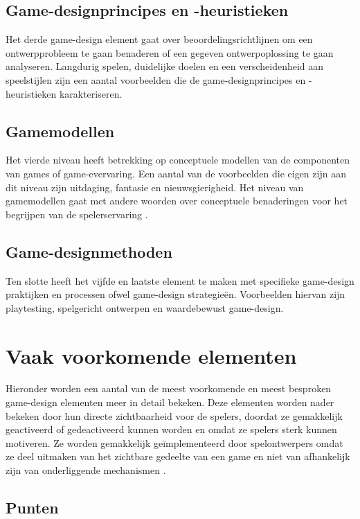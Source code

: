 \subsection{Game-designprincipes en -heuristieken}

Het derde game-design element gaat over beoordelingsrichtlijnen om een ontwerpprobleem te gaan benaderen of een gegeven ontwerpoplossing te gaan analyseren. Langdurig spelen, duidelijke doelen en een verscheidenheid aan speelstijlen zijn een aantal voorbeelden die de game-designprincipes en -heuristieken karakteriseren.

\subsection{Gamemodellen}

Het vierde niveau heeft betrekking op conceptuele modellen van de componenten van games of game-evervaring. Een aantal van de voorbeelden die eigen zijn aan dit niveau zijn uitdaging, fantasie en nieuwsgierigheid. Het niveau van gamemodellen gaat met andere woorden over conceptuele benaderingen voor het begrijpen van de spelerservaring \autocite{Lindholm2016}.

\subsection{Game-designmethoden}

Ten slotte heeft het vijfde en laatste element te maken met specifieke game-design praktijken en processen ofwel game-design strategieën. Voorbeelden hiervan zijn playtesting, spelgericht ontwerpen en waardebewust game-design.

\section{Vaak voorkomende elementen}

Hieronder worden een aantal van de meest voorkomende en meest besproken game-design elementen meer in detail bekeken. Deze elementen worden nader bekeken door hun directe zichtbaarheid voor de spelers, doordat ze gemakkelijk geactiveerd of gedeactiveerd kunnen worden en omdat ze spelers sterk kunnen motiveren. Ze worden gemakkelijk geïmplementeerd door spelontwerpers omdat ze deel uitmaken van het zichtbare gedeelte van een game en niet van afhankelijk zijn van onderliggende mechanismen \autocite{Sailer2016}.

\subsection{Punten}

